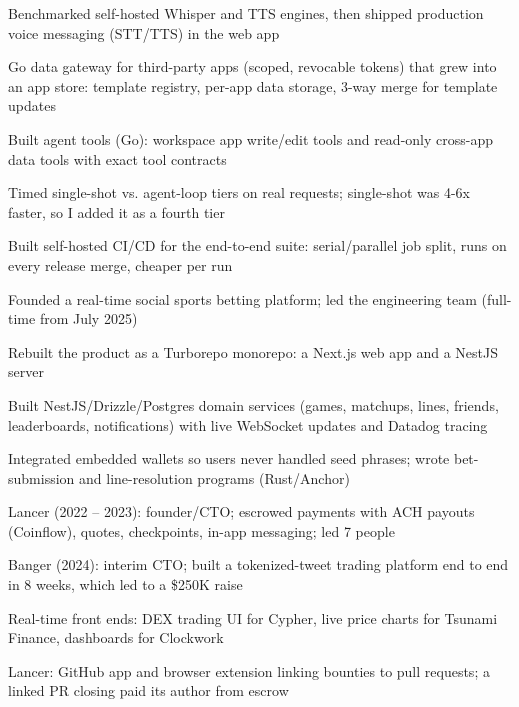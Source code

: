 \documentclass[print]{jack-resume}
\begin{document}
\begin{tightemize}
    \item Benchmarked self-hosted Whisper and TTS engines, then shipped production voice messaging (STT/TTS) in the web app
    \item Go data gateway for third-party apps (scoped, revocable tokens) that grew into an app store: template registry, per-app data storage, 3-way merge for template updates
    \item Built agent tools (Go): workspace app write/edit tools and read-only cross-app data tools with exact tool contracts
    \item Timed single-shot vs. agent-loop tiers on real requests; single-shot was 4-6x faster, so I added it as a fourth tier
    \item Built self-hosted CI/CD for the end-to-end suite: serial/parallel job split, runs on every release merge, cheaper per run
\end{tightemize}
\sectionsep

\begin{tightemize}
    \item Founded a real-time social sports betting platform; led the engineering team (full-time from July 2025)
    \item Rebuilt the product as a Turborepo monorepo: a Next.js web app and a NestJS server
    \item Built NestJS/Drizzle/Postgres domain services (games, matchups, lines, friends, leaderboards, notifications) with live WebSocket updates and Datadog tracing
    \item Integrated embedded wallets so users never handled seed phrases; wrote bet-submission and line-resolution programs (Rust/Anchor)
\end{tightemize}
\sectionsep

\begin{tightemize}
    \item Lancer (2022 -- 2023): founder/CTO; escrowed payments with ACH payouts (Coinflow), quotes, checkpoints, in-app messaging; led 7 people
    \item Banger (2024): interim CTO; built a tokenized-tweet trading platform end to end in 8 weeks, which led to a \$250K raise
    \item Real-time front ends: DEX trading UI for Cypher, live price charts for Tsunami Finance, dashboards for Clockwork
    \item Lancer: GitHub app and browser extension linking bounties to pull requests; a linked PR closing paid its author from escrow
\end{tightemize}
\sectionsep
\end{document}
